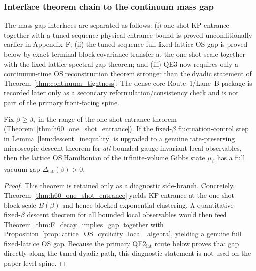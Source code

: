 \subsubsection{Interface theorem chain to the continuum mass gap}
The mass-gap interfaces are separated as follows:
(i) one-shot KP entrance together with a tuned-sequence physical entrance bound is proved unconditionally earlier in Appendix~F;
(ii) the tuned-sequence full fixed-lattice OS gap is proved below by exact terminal-block covariance transfer at the one-shot scale together with the fixed-lattice spectral-gap theorem; and
(iii) QE3 now requires only a continuum-time OS reconstruction theorem stronger than the dyadic statement of Theorem~\ref{thm:continuum_tightness}.
The dense-core Route~1/Lane~B package is recorded later only as a secondary reformulation/consistency check and is not part of the primary front-facing spine.

\begin{theorem}
Fix $\beta\ge\beta_\ast$ in the range of the one-shot entrance theorem (Theorem~\ref{thm:h60_one_shot_entrance}).
If the fixed-$\beta$ fluctuation-control step in Lemma~\ref{lem:descent_inequality} is upgraded to a genuine rate-preserving microscopic descent theorem for \emph{all} bounded gauge-invariant local observables, then the lattice OS Hamiltonian of the infinite-volume Gibbs state $\mu_\beta$ has a full vacuum gap $\Delta_{\mathrm{lat}}(\beta)>0$.
\end{theorem}

\begin{proof}
This theorem is retained only as a diagnostic side-branch.
Concretely, Theorem~\ref{thm:h60_one_shot_entrance} yields KP entrance at the one-shot block scale $B(\beta)$ and hence blocked exponential clustering.
A quantitative fixed-$\beta$ descent theorem for all bounded local observables would then feed Theorem~\ref{thm:F_decay_implies_gap} together with Proposition~\ref{prop:lattice_OS_cyclicity_local_algebra}, yielding a genuine full fixed-lattice OS gap.
Because the primary QE2$_{\mathrm{lat}}$ route below proves that gap directly along the tuned dyadic path, this diagnostic statement is not used on the paper-level spine.
\end{proof}

